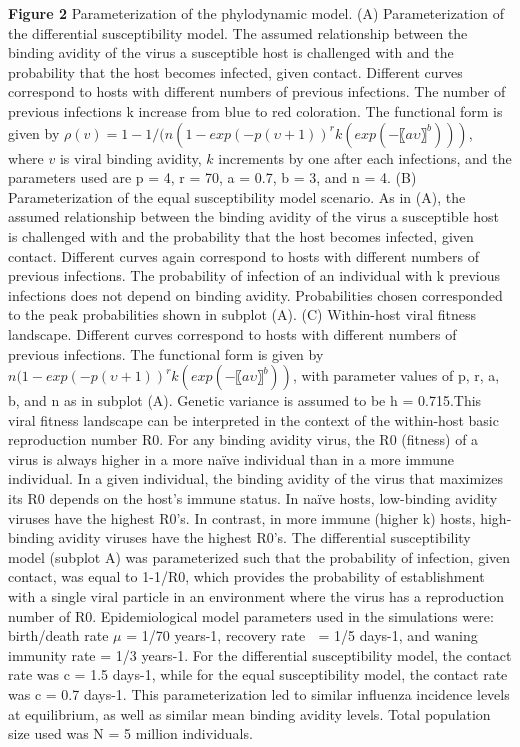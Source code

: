 \documentclass[12pt,a4paper]{article}
\begin{document}
{\bf Figure 2} Parameterization of the phylodynamic model. (A) Parameterization of the differential susceptibility model. The assumed relationship between the binding avidity of the virus a susceptible host is challenged with and the probability that the host becomes infected, given contact. Different curves correspond to hosts with different numbers of previous infections. The number of previous infections k increase from blue to red coloration. The functional form is given by $\rho(v)=1-1/(n(1-exp⁡(-p(υ+1))^rk (exp⁡(-〖aυ〗^b )))$, where $v$ is viral binding avidity, $k$ increments by one after each infections, and the parameters used are p = 4, r = 70, a = 0.7, b = 3, and n = 4. (B) Parameterization of the equal susceptibility model scenario. As in (A), the assumed relationship between the binding avidity of the virus a susceptible host is challenged with and the probability that the host becomes infected, given contact. Different curves again correspond to hosts with different numbers of previous infections. The probability of infection of an individual with k previous infections does not depend on binding avidity. Probabilities chosen corresponded to the peak probabilities shown in subplot (A). (C) Within-host viral fitness landscape. Different curves correspond to hosts with different numbers of previous infections. The functional form is given by $n(1-exp⁡(-p(υ+1))^rk (exp⁡(-〖aυ〗^b ))$, with parameter values of p, r, a, b, and n as in subplot (A). Genetic variance is assumed to be h = 0.715.This viral fitness landscape can be interpreted in the context of the within-host basic reproduction number R0. For any binding avidity virus, the R0 (fitness) of a virus is always higher in a more naïve individual than in a more immune individual. In a given individual, the binding avidity of the virus that maximizes its R0 depends on the host’s immune status. In naïve hosts, low-binding avidity viruses have the highest R0’s. In contrast, in more immune (higher k) hosts, high-binding avidity viruses have the highest R0’s. The differential susceptibility model (subplot A) was parameterized such that the probability of infection, given contact, was equal to 1-1/R0, which provides the probability of establishment with a single viral particle in an environment where the virus has a reproduction number of R0. Epidemiological model parameters used in the simulations were: birth/death rate $\mu$ = 1/70 years-1, recovery rate  = 1/5 days-1, and waning immunity rate = 1/3 years-1. For the differential susceptibility model, the contact rate was c = 1.5  days-1,  while for the equal susceptibility model, the contact rate was c = 0.7  days-1. This parameterization led to similar influenza incidence levels at equilibrium, as well as similar mean binding avidity levels. Total population size used was N =  5 million individuals.
\end{document}
